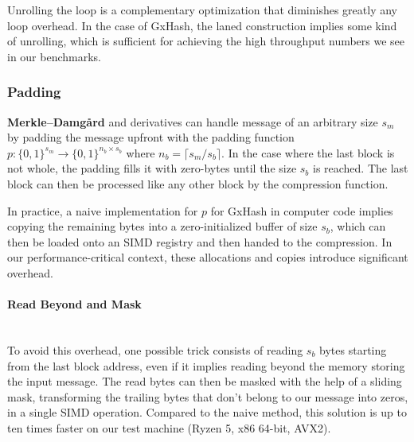 \documentclass[10pt]{article}
\begin{document}
Unrolling the loop is a complementary optimization that diminishes greatly any loop overhead. In the case of GxHash, the laned construction implies some kind of unrolling, which is sufficient for achieving the high throughput numbers we see in our benchmarks.

\subsubsection{Padding}

\textbf{Merkle–Damgård} and derivatives can handle message of an arbitrary size \( s_m \) by padding the message upfront with the padding function \( p: \{0,1\}^{s_m} \to \{0,1\}^{n_b \times s_b} \) where \( n_b = \lceil s_m/s_b \rceil \). In the case where the last block is not whole, the padding fills it with zero-bytes until the size \( s_b \) is reached. The last block can then be processed like any other block by the compression function.

In practice, a naive implementation for \( p \) for GxHash in computer code implies copying the remaining bytes into a zero-initialized buffer of size \( s_b \), which can then be loaded onto an SIMD registry and then handed to the compression. In our performance-critical context, these allocations and copies introduce significant overhead.

\paragraph{Read Beyond and Mask}\leavevmode\\
To avoid this overhead, one possible trick consists of reading \( s_b \) bytes starting from the last block address, even if it implies reading beyond the memory storing the input message. The read bytes can then be masked with the help of a sliding mask, transforming the trailing bytes that don't belong to our message into zeros, in a single SIMD operation. Compared to the naive method, this solution is up to ten times faster on our test machine (Ryzen 5, x86 64-bit, AVX2).
\end{document}
